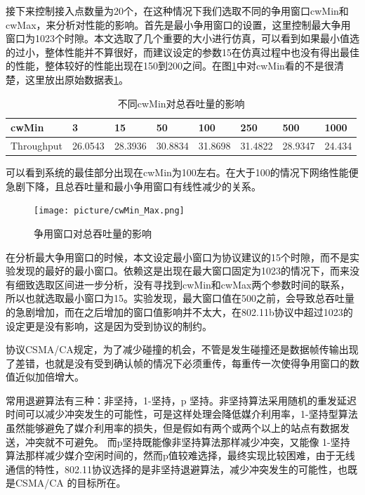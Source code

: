 \documentclass{article}
\begin{document}
接下来控制接入点数量为20个，在这种情况下我们选取不同的争用窗口cwMin和cwMax，来分析对性能的影响。首先是最小争用窗口的设置，这里控制最大争用窗口为1023个时隙。本文选取了几个重要的大小进行仿真，可以看到如果最小值选的过小，整体性能并不算很好，而建议设定的参数15在仿真过程中也没有得出最佳的性能，整体较好的性能出现在150到200之间。在图\ref{fig:cwMin_Max}中对cwMin看的不是很清楚，这里放出原始数据表\ref{tab:cwMin}。

\begin{table}[]
	\centering
	\begin{tabular}{llllllll}
		\hline
		cwMin      & 3       & 15      & 50      & 100     & 250     & 500     & 1000   \\
		\hline
		Throughput & 26.0543 & 28.3936 & 30.8834 & 31.8698 & 31.4822 & 28.9347 & 24.434 \\
		\hline
	\end{tabular}
	\caption{不同cwMin对总吞吐量的影响}
	\label{tab:cwMin}
\end{table}

可以看到系统的最佳部分出现在cwMin为100左右。在大于100的情况下网络性能便急剧下降，且总吞吐量和最小争用窗口有线性减少的关系。

\begin{figure}[ht]
	\centering
	\texttt{[image: picture/cwMin\_Max.png]}
	\caption{争用窗口对总吞吐量的影响}
	\label{fig:cwMin_Max}
\end{figure}

在分析最大争用窗口的时候，本文设定最小窗口为协议建议的15个时隙，而不是实验发现的最好的最小窗口。依赖这是出现在最大窗口固定为1023的情况下，而来没有细致选取区间进一步分析，没有寻找到cwMin和cwMax两个参数时间的联系，所以也就选取最小窗口为15。实验发现，最大窗口值在500之前，会导致总吞吐量的急剧增加，而在之后增加的窗口值影响并不太大，在802.11b协议中超过1023的设定更是没有影响，这是因为受到协议的制约。

协议CSMA/CA规定，为了减少碰撞的机会，不管是发生碰撞还是数据帧传输出现了差错，也就是没有受到确认帧的情况下必须重传，每重传一次使得争用窗口的数值近似加倍增大。

常用退避算法有三种：非坚持，1-坚持，p 坚持。非坚持算法采用随机的重发延迟时间可以减少冲突发生的可能性，可是这样处理会降低媒介利用率，1-坚持型算法虽然能够避免了媒介利用率的损失，但是假如有两个或两个以上的站点有数据发送，冲突就不可避免。 而p坚持既能像非坚持算法那样减少冲突，又能像 1-坚持算法那样减少媒介空闲时间的，然而p值较难选择，最终实现比较困难，由于无线通信的特性，802.11协议选择的是非坚持退避算法，减少冲突发生的可能性，也既是CSMA/CA 的目标所在。
\end{document}
